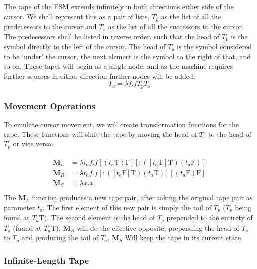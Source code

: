 \documentclass[Master.tex]{subfiles}
\begin{document}
The tape of the FSM extends infinitely in both directions either side of the cursor. We shall represent this as a pair of lists, $T_p$ as the list of all the predecessors to the cursor and $T_s$ as the list of all the successors to the cursor. The predecessors shall be listed in reverse order, such that the head of $T_p$ is the symbol directly to the left of the cursor. The head of $T_s$ is the symbol considered to be `under' the cursor, the next element is the symbol to the right of that, and so on. These tapes will begin as a single node, and as the machine requires further squares in either direction further nodes will be added.
\begin{equation*}
T_a = \lambda f.f T_p T_s
\end{equation*}

\subsubsection{Movement Operations}
To emulate cursor movement, we will create transformation functions for the tape. These functions will shift the tape by moving the head of $T_s$ to the head of $T_p$ or vice versa.

\begin{gather*}
\begin{aligned}
\bm{M}_L &= \lambda t_a f.f [(t_a\bm{\mathrm{T}})\bm{\mathrm{F}}] [\bm{\mathrm{:}}([t_a\bm{\mathrm{T}}]\bm{\mathrm{T}})(t_a\bm{\mathrm{F}})]\\
\bm{M}_R &= \lambda t_a f.f [\bm{\mathrm{:}}([t_a\bm{\mathrm{F}}]\bm{\mathrm{T}})(t_a\bm{\mathrm{T}})] [(t_a\bm{\mathrm{F}})\bm{\mathrm{F}}]\\
\bm{M}_S &= \lambda x.x\\
\end{aligned}
\end{gather*}
The $\bm{M}_L$ function produces a new tape pair, after taking the original tape pair as parameter $t_a$. The first element of this new pair is simply the tail of $T_p$ ($T_p$ being found at $T_a\bm{\mathrm{T}})$. The second element is the head of $T_p$ prepended to the entirety of $T_s$ (found at $T_a\bm{\mathrm{T}})$. $\bm{M}_R$ will do the effective opposite, prepending the head of $T_s$ to $T_p$ and producing the tail of $T_s$. $\bm{M}_S$ Will keep the tape in its current state.

\subsubsection{Infinite-Length Tape}
\end{document}
